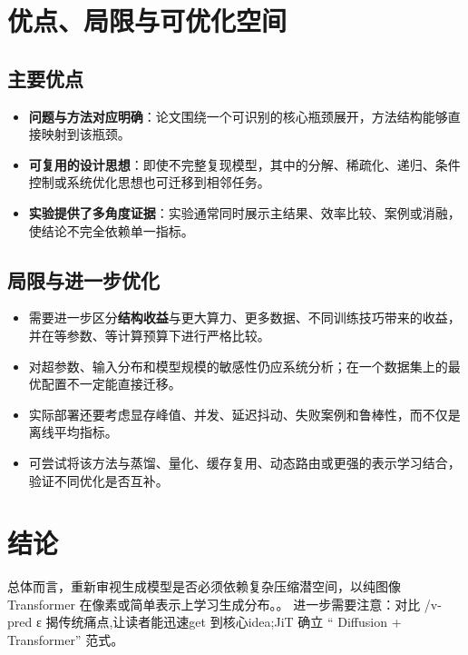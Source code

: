 \documentclass[UTF8,11pt,a4paper]{ctexart}
\newcommand{\term}[1]{\textbf{\textcolor{mainblue}{#1}}}
\begin{document}
\section{优点、局限与可优化空间}
\subsection{主要优点}
\begin{itemize}
\item \term{问题与方法对应明确}：论文围绕一个可识别的核心瓶颈展开，方法结构能够直接映射到该瓶颈。
\item \term{可复用的设计思想}：即使不完整复现模型，其中的分解、稀疏化、递归、条件控制或系统优化思想也可迁移到相邻任务。
\item \term{实验提供了多角度证据}：实验通常同时展示主结果、效率比较、案例或消融，使结论不完全依赖单一指标。
\end{itemize}

\subsection{局限与进一步优化}
\begin{itemize}
\item 需要进一步区分\term{结构收益}与更大算力、更多数据、不同训练技巧带来的收益，并在等参数、等计算预算下进行严格比较。
\item 对超参数、输入分布和模型规模的敏感性仍应系统分析；在一个数据集上的最优配置不一定能直接迁移。
\item 实际部署还要考虑显存峰值、并发、延迟抖动、失败案例和鲁棒性，而不仅是离线平均指标。
\item 可尝试将该方法与蒸馏、量化、缓存复用、动态路由或更强的表示学习结合，验证不同优化是否互补。
\end{itemize}

\section{结论}
总体而言，重新审视生成模型是否必须依赖复杂压缩潜空间，以纯图像 Transformer 在像素或简单表示上学习生成分布。。 进一步需要注意：对比 /v-pred ε 揭传统痛点,让读者能迅速get 到核心idea;JiT 确立 “ Diffusion + Transformer” 范式。
\end{document}
